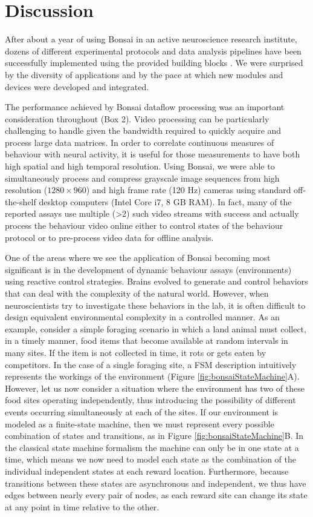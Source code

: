 
\section{Discussion}

After about a year of using Bonsai in an active neuroscience research institute, dozens of different experimental protocols and data analysis pipelines have been successfully implemented using the provided building blocks \cite{Gouvea2014, Itskov2014, Tecuapetla2014}. We were surprised by the diversity of applications and by the pace at which new modules and devices were developed and integrated.

The performance achieved by Bonsai dataflow processing was an important consideration throughout (Box 2). Video processing can be particularly challenging to handle given the bandwidth required to quickly acquire and process large data matrices. In order to correlate continuous measures of behaviour with neural activity, it is useful for those measurements to have both high spatial and high temporal resolution. Using Bonsai, we were able to simultaneously process and compress grayscale image sequences from high resolution ($1280 \times 960$) and high frame rate (120 Hz) cameras using standard off-the-shelf desktop computers (Intel Core i7, 8 GB RAM). In fact, many of the reported assays use multiple (>2) such video streams with success and actually process the behaviour video online either to control states of the behaviour protocol or to pre-process video data for offline analysis.

One of the areas where we see the application of Bonsai becoming most significant is in the development of dynamic behaviour assays (environments) using reactive control strategies. Brains evolved to generate and control behaviors that can deal with the complexity of the natural world. However, when neuroscientists try to investigate these behaviors in the lab, it is often difficult to design equivalent environmental complexity in a controlled manner. As an example, consider a simple foraging scenario in which a land animal must collect, in a timely manner, food items that become available at random intervals in many sites. If the item is not collected in time, it rots or gets eaten by competitors. In the case of a single foraging site, a FSM description intuitively represents the workings of the environment (Figure \ref{fig:bonsaiStateMachine}A). However, let us now consider a situation where the environment has two of these food sites operating independently, thus introducing the possibility of different events occurring simultaneously at each of the sites. If our environment is modeled as a finite-state machine, then we must represent every possible combination of states and transitions, as in Figure \ref{fig:bonsaiStateMachine}B. In the classical state machine formalism the machine can only be in one state at a time, which means we now need to model each state as the combination of the individual independent states at each reward location. Furthermore, because transitions between these states are asynchronous and independent, we thus have edges between nearly every pair of nodes, as each reward site can change its state at any point in time relative to the other.

